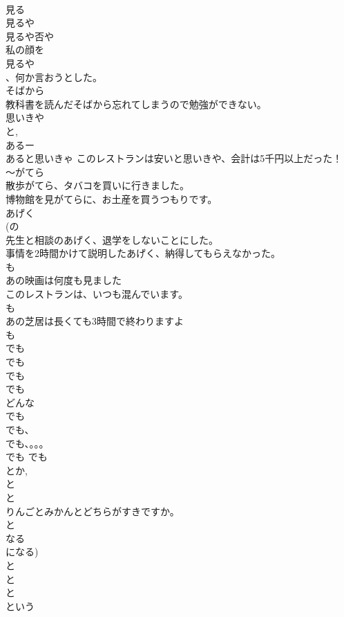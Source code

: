 \documentclass[8pt]{extreport}
\begin{document}
\begin{CJK}{UTF8}{min}
\\	見る 
\\	見るや 
\\	見るや否や
\\	私の顔を
\\	見るや
\\	、何か言おうとした。
\\	そばから	
\\	教科書を読んだそばから忘れてしまうので勉強ができない。
\\	思いきや	
\\	と, 
\\	あるー
\\	あると思いきゃ このレストランは安いと思いきや、会計は5千円以上だった！
\\	～がてら	
\\	散歩がてら、タバコを買いに行きました。
\\	博物館を見がてらに、お土産を買うつもりです。
\\	あげく	
\\	(の 
\\	先生と相談のあげく、退学をしないことにした。
\\	事情を2時間かけて説明したあげく、納得してもらえなかった。
\\	も 
\\	あの映画は何度も見ました 
\\	このレストランは、いつも混んでいます。 
\\	も 
\\	あの芝居は長くても3時間で終わりますよ 
\\	も	
\\	でも 
\\	でも 
\\	でも 
\\	でも	
\\	どんな 
\\	でも	
\\	でも、
\\	でも、。。。
\\	でも	でも 
\\	とか, 
\\	と 
\\	と	
\\	りんごとみかんとどちらがすきですか。
\\	と
\\	なる	
\\	になる) 
\\	と 
\\	と  
\\	と  
\\	という	

\end{CJK}
\end{document}
